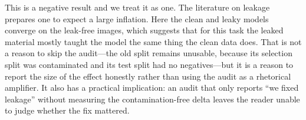 This is a negative result and we treat it as one. The literature on leakage
\citep{kapoor2023leakage,recht2019imagenet} prepares one to expect a large
inflation. Here the clean and leaky models converge on the leak-free images, which
suggests that for this task the leaked material mostly taught the model the same
thing the clean data does. That is not a reason to skip the audit---the old split
remains unusable, because its selection split was contaminated and its test split
had no negatives---but it is a reason to report the size of the effect honestly
rather than using the audit as a rhetorical amplifier. It also has a practical
implication: an audit that only reports ``we fixed leakage'' without measuring the
contamination-free delta leaves the reader unable to judge whether the fix
mattered.
